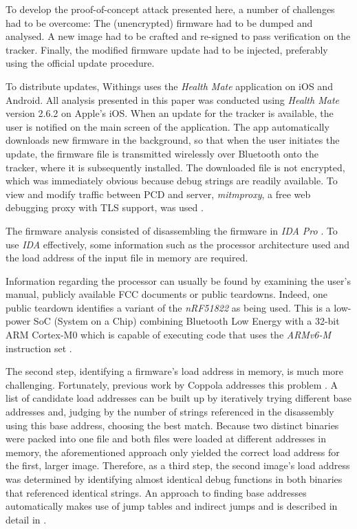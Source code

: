 \documentclass[english]{lni}
\begin{document}
To develop the proof-of-concept attack presented here, a number of challenges had to be overcome: The (unencrypted) firmware had to be dumped and analysed. A new image had to be crafted and re-signed to pass verification on the tracker. Finally, the modified firmware update had to be injected, preferably using the official update procedure.

To distribute updates, Withings uses the \emph{Health Mate} application on iOS and Android. All analysis presented in this paper was conducted using \emph{Health Mate} version 2.6.2 on Apple's iOS. When an update for the tracker is available, the user is notified on the main screen of the application. The app automatically downloads new firmware in the background, so that when the user initiates the update, the firmware file is transmitted wirelessly over Bluetooth onto the tracker, where it is subsequently installed. The downloaded file is not encrypted, which was immediately obvious because debug strings are readily available.
To view and modify traffic between PCD and server, \emph{mitmproxy}, a free web debugging proxy with TLS support, was used \cite{mitmproxy}.

The firmware analysis consisted of disassembling the firmware in \emph{IDA Pro} \cite{IDAPro}. To use \emph{IDA} effectively, some information such as the processor architecture used and the load address of the input file in memory are required. 

Information regarding the processor can usually be found by examining the user's manual, publicly available FCC documents or public teardowns. Indeed, one public teardown \cite{WithingsTeardown} identifies a variant of the \emph{nRF51822} as being used. This is a low-power SoC (System on a Chip) combining Bluetooth Low Energy with a 32-bit ARM Cortex-M0 which is capable of executing code that uses the \emph{ARMv6-M} instruction set \cite{nRF51822, ARMCortexM0}.

The second step, identifying a firmware's load address in memory, is much more challenging. Fortunately, previous work by Coppola addresses this problem \cite{Coppola}. A list of candidate load addresses can be built up by iteratively trying different base addresses and, judging by the number of strings referenced in the disassembly using this base address, choosing the best match.
Because two distinct binaries were packed into one file and both files were loaded at different addresses in memory, the aforementioned approach only yielded the correct load address for the first, larger image. Therefore, as a third step, the second image's load address was determined by identifying almost identical debug functions in both binaries that referenced identical strings. An approach to finding base addresses automatically makes use of jump tables and indirect jumps and is described in detail in \cite{shoshitaishvili2015firmalice}.
\end{document}
